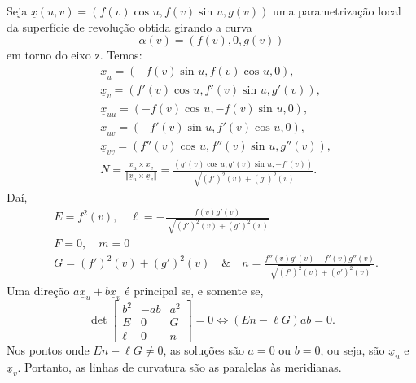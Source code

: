 \documentclass[../differential_geometry.tex]{subfiles}
\begin{document}
\begin{example}
	Seja \(\underline{x}(u, v) = (f(v)\cos^{}{u}, f(v)\sin^{}{u}, g(v))\) uma parametrização local da superfície de revolução obtida girando a curva
	\[
		\alpha (v) = (f(v), 0, g(v))
	\]
	em torno do eixo z. Temos:
	\begin{align*}
		 & \underline{x}_{u} = (-f(v)\sin^{}{u}, f(v)\cos^{}{u}, 0),                                                                                                                                       \\
		 & \underline{x}_{v} = (f'(v)\cos^{}{u}, f'(v)\sin^{}{u}, g'(v)),                                                                                                                                  \\
		 & \underline{x}_{uu} = (-f(v)\cos^{}{u}, -f(v)\sin^{}{u}, 0),                                                                                                                                     \\
		 & \underline{x}_{uv} = (-f'(v)\sin^{}{u}, f'(v)\cos^{}{u}, 0),                                                                                                                                    \\
		 & \underline{x}_{vv} = (f''(v)\cos^{}{u}, f''(v)\sin^{}{u}, g''(v)),                                                                                                                              \\
		 & N = \frac{\underline{x}_{u}\times \underline{x}_{v}}{\Vert \underline{x}_u \times \underline{x}_v \Vert} = \frac{(g'(v)\cos^{}{u}, g'(v)\sin^{}{u}, -f'(v))}{\sqrt[]{(f')^{2}(v)+(g')^{2}(v)}}.
	\end{align*}
	Daí,
	\begin{align*}
		 & E = f^{2}(v), \quad \ell = - \frac{f(v)g'(v)}{\sqrt[]{(f')^{2}(v) + (g')^{2}(v)}}                                  \\
		 & F = 0, \quad m = 0                                                                                                 \\
		 & G = (f')^{2}(v) + (g')^{2}(v) \quad\&\quad n = \frac{f''(v)g'(v)-f'(v)g''(v)}{\sqrt[]{(f')^{2}(v) + (g')^{2}(v)}}.
	\end{align*}
	Uma direção \(a\underline{x}_u + b\underline{x}_v\) é principal se, e somente se,
	\[
		\det \begin{bmatrix}
			b^{2} & -ab & a^{2} \\
			E     & 0   & G     \\
			\ell  & 0   & n
		\end{bmatrix} = 0 \Longleftrightarrow (En - \ell G)ab = 0.
	\]
	Nos pontos onde \(En-\ell G \neq 0\), as soluções são \(a=0\) ou \(b=0\), ou seja, são \(\underline{x}_{u}\) e \(\underline{x}_v\). Portanto, as linhas de curvatura são as paralelas às meridianas.
\end{example}
\end{document}
